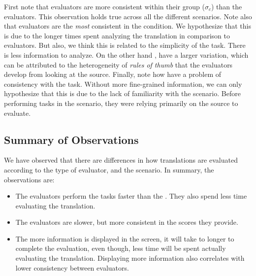 First note that \mono evaluators are more consistent within their group ($\sigma_c$) than the \bil evaluators. This observation holds true across all the different scenarios. Note also that \mono evaluators are the \emph{most} consistent in the \tgt condition.  We hypothesize that this is due to the longer times spent analyzing the translation in comparison to \bil evaluators. But also, we think this is related to the simplicity of the task. There is less information to analyze. On the other hand \bil, have a larger variation, which can be attributed to the heterogeneity of \emph{rules of thumb} that the evaluators develop from looking at the source.
Finally, note how \bil have a problem of consistency with the \tgt task. Without more fine-grained information, we can only hypothesize that this is due to the lack of familiarity with the scenario. Before performing tasks in the \tgt scenario, they were relying primarily on the source to evaluate.%


\subsection{Summary of Observations}
We have observed that there are differences in how translations are evaluated according to the type of evaluator, and the scenario. In summary, the observations are:
\begin{itemize}
\item The \bil evaluators perform the tasks faster than the \mono. They also spend less time evaluating the translation.
\item The \mono evaluators are slower, but more consistent in the scores they provide. %
\item The more information is displayed in the screen, it will take to longer to complete the evaluation, even though, less time will be spent actually evaluating the translation. Displaying more information also correlates with lower consistency between evaluators.
\end{itemize}

